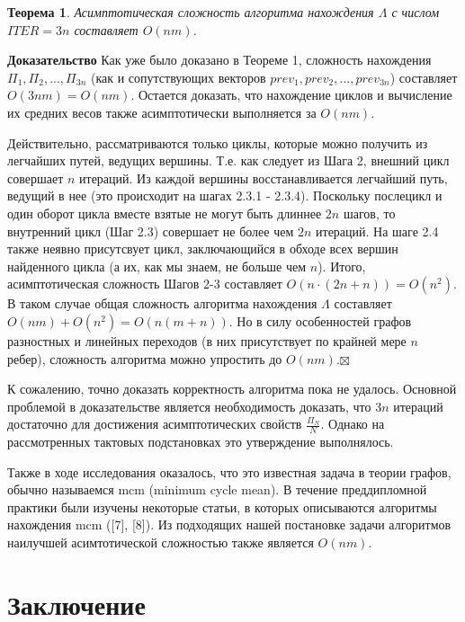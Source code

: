 \documentclass[a4paper,12pt]{extarticle}
\theoremstyle{plain} %
\newtheorem{theorem}{Теорема}
\begin{document}
\begin{large}
\begin{theorem}
Асимптотическая сложность алгоритма нахождения $\Lambda$ с числом $ITER = 3n$ составляет $O(nm)$.
\end{theorem}
\textbf{Доказательство}
Как уже было доказано в Теореме 1, сложность нахождения $\Pi_1, \Pi_2, ..., \Pi_{3n}$ (как и сопутствующих векторов $prev_1, prev_2, ..., prev_{3n}$) составляет $O(3nm) = O(nm)$. Остается доказать, что нахождение циклов и вычисление их средних весов также асимптотически выполняется за $O(nm)$.

Действительно, рассматриваются только циклы, которые можно получить из легчайших путей, ведущих вершины. Т.е. как следует из Шага 2, внешний цикл совершает $n$ итераций. Из каждой вершины восстанавливается легчайший путь, ведущий в нее (это происходит на шагах 2.3.1 - 2.3.4). Поскольку послецикл и один оборот цикла вместе взятые не могут быть длиннее $2n$ шагов, то внутренний цикл (Шаг 2.3) совершает не более чем $2n$ итераций. На шаге 2.4 также неявно присутсвует цикл, заключающийся в обходе всех вершин найденного цикла (а их, как мы знаем, не больше чем $n$). Итого, асимптотическая сложность Шагов 2-3 составляет $O(n \cdot (2n + n)) = O(n^2)$. В таком случае общая сложность алгоритма нахождения $\Lambda$ составляет $O(nm) + O(n^2) = O(n(m+n))$. Но в силу особенностей графов разностных и линейных переходов (в них присутствует по крайней мере $n$ ребер), сложность алгоритма можно упростить до $O(nm)$.$\boxtimes$
\bigskip

К сожалению, точно доказать корректность алгоритма пока не удалось. Основной проблемой в доказательстве является необходимость доказать, что $3n$ итераций достаточно для достижения асимптотических свойств $\frac{\Pi_N}{N}$. Однако на рассмотренных тактовых подстановках это утверждение выполнялось.

Также в ходе исследования оказалось, что это известная задача в теории графов, обычно называемся mcm (minimum cycle mean). В течение преддипломной практики были изучены некоторые статьи, в которых описываются алгоритмы нахождения mcm ([7], [8]). Из подходящих нашей постановке задачи алгоритмов наилучшей асимтотической сложностью также является $O(nm)$.

\newpage
\section*{Заключение}
\vspace*{1cm}


\end{large}
\end{document}
